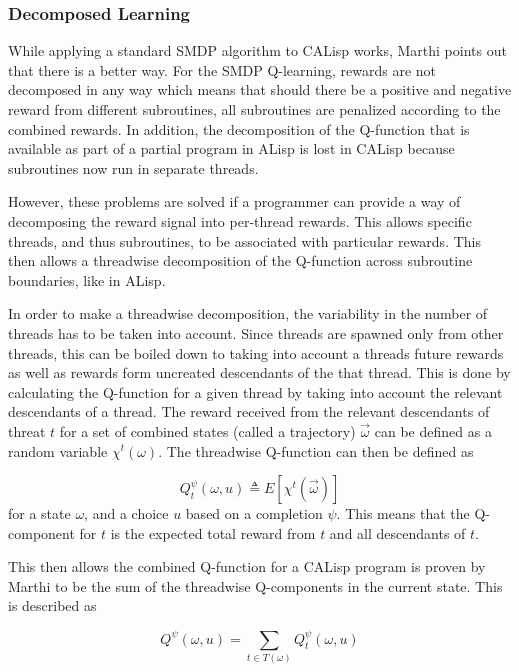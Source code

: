 \documentclass[jair,twoside,11pt,theapa]{article}
\begin{document}
\subsubsection{Decomposed Learning}
While applying a standard SMDP algorithm to CALisp works, Marthi points out that there is a better way. For the SMDP Q-learning, rewards are not decomposed in any way which means that should there be a positive and negative reward from different subroutines, all subroutines are penalized according to the combined rewards. In addition, the decomposition of the Q-function that is available as part of a partial program in ALisp is lost in CALisp because subroutines now run in separate threads.

However, these problems are solved if a programmer can provide a way of decomposing the reward signal into per-thread rewards. This allows specific threads, and thus subroutines, to be associated with particular rewards. This then allows a threadwise decomposition of the Q-function across subroutine boundaries, like in ALisp. 

In order to make a threadwise decomposition, the variability in the number of threads has to be taken into account. Since threads are spawned only from other threads, this can be boiled down to taking into account a threads future rewards as well as rewards form uncreated descendants of the that thread. This is done by calculating the Q-function for a given thread by taking into account the relevant descendants of a thread. The reward received from the relevant descendants of threat $t$ for a set of combined states (called a trajectory) $\vec{\omega}$ can be defined as a random variable $\chi ^t(\omega)$. The threadwise Q-function can then be defined as 

\begin{equation}
Q^{\psi}_t (\omega, u) \triangleq E[\chi^t(\vec{\omega})]
\end{equation}  
for a state $\omega$, and a choice $u$ based on a completion $\psi$. This means that the Q-component for $t$ is the expected total reward from $t$ and all descendants of $t$. 

This then allows the combined Q-function for a CALisp program is proven by Marthi to be the sum of the threadwise Q-components in the current state. This is described as 

\begin{equation}
Q^{\psi} (\omega, u) = \sum_{t \in T(\omega)} Q^{\psi}_t (\omega, u) 
\end{equation}  
\end{document}

